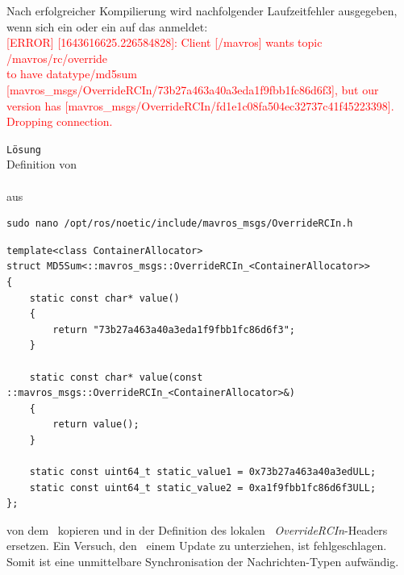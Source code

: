 Nach erfolgreicher Kompilierung wird nachfolgender Laufzeitfehler ausgegeben, wenn sich ein  oder ein  auf das  anmeldet:\\
\textcolor{red}{[ERROR] [1643616625.226584828]: Client [/mavros] wants topic /mavros/rc/override \\to have datatype/md5sum [mavros\_msgs/OverrideRCIn/73b27a463a40a3eda1f9fbb1fc86d6f3], but our version has [mavros\_msgs/OverrideRCIn/fd1e1c08fa504ec32737c41f45223398]. Dropping connection.}

\texttt{Lösung}\\
Definition von \\ \\aus 

\begin{lstlisting}[style=Style_Bash, caption=Befehl zum Öffnen des \textit{OverrideRCIn}-Headers]
sudo nano /opt/ros/noetic/include/mavros_msgs/OverrideRCIn.h
\end{lstlisting}

\begin{lstlisting}[style=Style_CPP, numbers=none, caption=Definition des Struct \CodeStruct{MD5Sum} für das Template \textit{OverrideRCIn}]
template<class ContainerAllocator>
struct MD5Sum<::mavros_msgs::OverrideRCIn_<ContainerAllocator>>
{
	static const char* value()
	{
		return "73b27a463a40a3eda1f9fbb1fc86d6f3";
	}

	static const char* value(const ::mavros_msgs::OverrideRCIn_<ContainerAllocator>&)
	{
		return value();
	}
	
	static const uint64_t static_value1 = 0x73b27a463a40a3edULL;
	static const uint64_t static_value2 = 0xa1f9fbb1fc86d6f3ULL;
};
\end{lstlisting}

von dem \Pie\ kopieren und in der Definition des lokalen \ROS\ \textit{\mbox{OverrideRCIn}}-Headers ersetzen.
Ein Versuch, den \Pie\ einem Update zu unterziehen, ist fehlgeschlagen. Somit ist eine unmittelbare Synchronisation der Nachrichten-Typen aufwändig.


